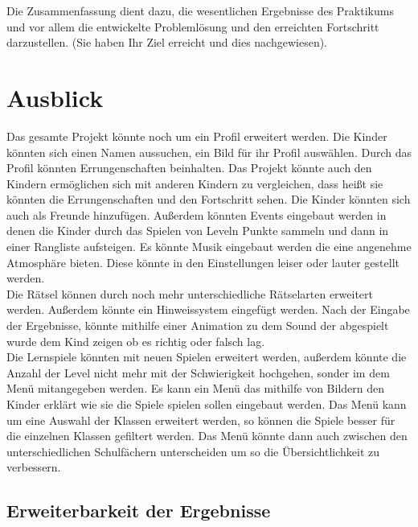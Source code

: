 Die Zusammenfassung dient dazu, die wesentlichen Ergebnisse des
Praktikums und vor allem die entwickelte Problemlösung und den
erreichten Fortschritt darzustellen. (Sie haben Ihr Ziel erreicht und
dies nachgewiesen).

\section{Ausblick}
\label{sec:ausblick}

Das gesamte Projekt könnte noch um ein Profil erweitert werden. Die Kinder könnten sich einen Namen aussuchen, ein Bild für ihr Profil auswählen. Durch das Profil könnten Errungenschaften beinhalten. Das Projekt könnte auch den Kindern ermöglichen sich mit anderen Kindern zu vergleichen, dass heißt sie könnten die Errungenschaften und den Fortschritt sehen. Die Kinder könnten sich auch als Freunde hinzufügen. Außerdem könnten Events eingebaut werden in denen die Kinder durch das Spielen von Leveln Punkte sammeln und dann in einer Rangliste aufsteigen. Es könnte Musik eingebaut werden die eine angenehme Atmosphäre bieten. Diese könnte in den Einstellungen leiser oder lauter gestellt werden. \\
Die Rätsel können durch noch mehr unterschiedliche Rätselarten erweitert werden. Außerdem könnte ein Hinweissystem eingefügt werden. Nach der Eingabe der Ergebnisse, könnte mithilfe einer Animation zu dem Sound der abgespielt wurde dem Kind zeigen ob es richtig oder falsch lag.\\
Die Lernspiele könnten mit neuen Spielen erweitert werden, außerdem könnte die Anzahl der Level nicht mehr mit der Schwierigkeit hochgehen, sonder im dem Menü mitangegeben werden. Es kann ein Menü das mithilfe von Bildern den Kinder erklärt wie sie die Spiele spielen sollen eingebaut werden. Das Menü kann um eine Auswahl der Klassen erweitert werden, so können die Spiele besser für die einzelnen Klassen gefiltert werden. Das Menü könnte dann auch zwischen den unterschiedlichen Schulfächern unterscheiden um so die Übersichtlichkeit zu verbessern.\\

\subsection{Erweiterbarkeit der Ergebnisse}
\label{sub:erweiterbarkeit}

